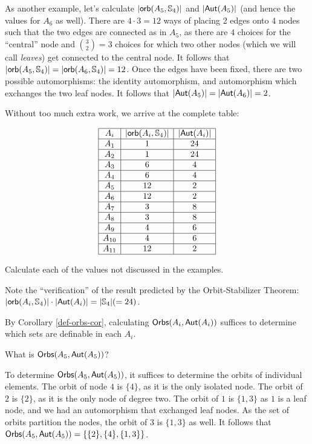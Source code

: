 As another example, let's calculate $\mbox{$|\mbox{$\mathsf{orb}(A_5,\mbox{$\mathbb{S}_{4}$})$}|$}$ and $\mbox{$|\mbox{$\mathsf{Aut}(A_5)$}|$}$ (and hence the values for $A_6$ as well). There are $4 \cdot 3 = 12$ ways of placing 2 edges onto 4 nodes such that the two edges are connected as in $A_5$, as there are $4$ choices for the ``central'' node and $\binom{3}{2} = 3$ choices for which two other nodes (which we will call \emph{leaves}) get connected to the central node. It follows that $\mbox{$|\mbox{$\mathsf{orb}(A_5,\mbox{$\mathbb{S}_{4}$})$}|$} = \mbox{$|\mbox{$\mathsf{orb}(A_6,\mbox{$\mathbb{S}_{4}$})$}|$} = 12$. Once the edges have been fixed, there are two possible automorphisms: the identity automorphism, and automorphism which exchanges the two leaf nodes. It follows that $\mbox{$|\mbox{$\mathsf{Aut}(A_5)$}|$} = \mbox{$|\mbox{$\mathsf{Aut}(A_6)$}|$} = 2$. 

Without too much extra work, we arrive at the complete table:

\[
\begin{array}{|c|c|c|}
\hline
A_i  & \mbox{$|\mbox{$\mathsf{orb}(A_i,\mbox{$\mathbb{S}_{4}$})$}|$} & \mbox{$|\mbox{$\mathsf{Aut}(A_i)$}|$}\\
\hline
A_1 & 1 & 24\\
\hline
A_2 & 1 & 24 \\
\hline
A_3 & 6 & 4\\
\hline
A_4 & 6 & 4\\
\hline
A_5 & 12 & 2\\
\hline
A_6 & 12 & 2\\
\hline
A_7 & 3 & 8 \\
\hline
A_8 & 3 & 8 \\
\hline
A_9 & 4 & 6 \\
\hline
A_{10} & 4 & 6 \\
\hline
A_{11} & 12 & 2\\
\hline
\end{array}
\]

\begin{aside}
    Calculate each of the values not discussed in the examples. 
\end{aside}

Note the ``verification'' of the result predicted by the Orbit-Stabilizer Theorem: $\mbox{$|\mbox{$\mathsf{orb}(A_i,\mbox{$\mathbb{S}_{4}$})$}|$} \cdot \mbox{$|\mbox{$\mathsf{Aut}(A_i)$}|$} = \mbox{$|\mbox{$\mathbb{S}_{4}$}|$} (= 24)$.

By Corollary \ref{def-orbs-cor}, calculating $\mbox{$\mathsf{Orbs}(A_i,\mbox{$\mathsf{Aut}(A_i)$})$}$ suffices to determine which sets are definable in each $A_i$. 

\begin{example}
What is $\mbox{$\mathsf{Orbs}(A_5,\mbox{$\mathsf{Aut}(A_5)$})$}$?
\end{example}
To determine $\mbox{$\mathsf{Orbs}(A_5,\mbox{$\mathsf{Aut}(A_5)$})$}$, it suffices to determine the orbits of individual elements. The orbit of node $4$ is $\{4\}$, as it is the only isolated node. The orbit of $2$ is $\{2\}$, as it is the only node of degree two. The orbit of $1$ is $\{1, 3\}$ as $1$ is a leaf node, and we had an automorphism that exchanged leaf nodes. As the set of orbits partition the nodes, the orbit of $3$ is $\{1, 3\}$ as well. It follows that $\mbox{$\mathsf{Orbs}(A_5,\mbox{$\mathsf{Aut}(A_5)$})$} = \{\{2\}, \{4\}, \{1, 3\}\}$. 

